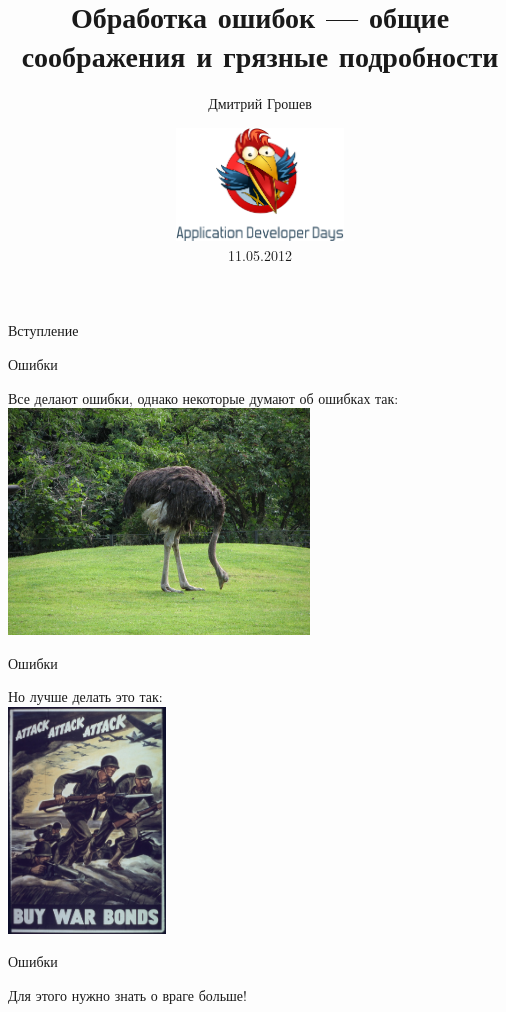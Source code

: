 \documentclass[10pt]{beamer}
\title[Об ошибках]{Обработка ошибок — общие соображения и грязные подробности}
\author{Дмитрий Грошев}
\date{\includegraphics[height=3cm]{add-large}\\11.05.2012}
\institute{}
\begin{document}
\begin{frame}
\titlepage
\end{frame}

\begin{frame}{}
  \begin{center}
    \huge Вступление
  \end{center}
\end{frame}

\begin{frame}{Ошибки}
  \begin{center}
    Все делают ошибки, однако некоторые думают об ошибках так:\vspace{3mm}\\
    \includegraphics[height=6cm]{ostrich}
  \end{center}
\end{frame}

\begin{frame}{Ошибки}
  \begin{center}
    Но лучше делать это так:\vspace{3mm}\\
    \includegraphics[height=6cm]{attack}
  \end{center}
\end{frame}

\begin{frame}{Ошибки}
  \begin{center}
    Для этого нужно знать о враге больше!
  \end{center}
\end{frame}
\end{document}

